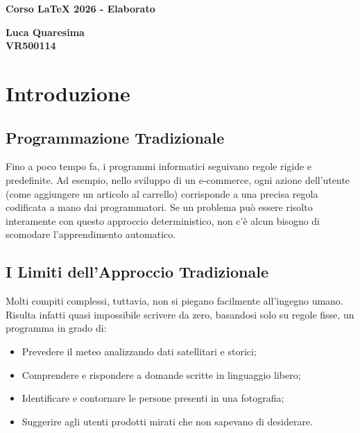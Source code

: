 \documentclass[a4paper,12pt]{report}
\begin{document}
\begin{titlepage}
    \begin{center}
        \vspace*{2cm}

        \Huge
        \textbf{Corso \LaTeX{} 2026 - Elaborato}

        \vspace{1.5cm}
        
        \Large
        \textbf{Luca Quaresima\\VR500114}

        \vspace*{1cm}
    \end{center}
\end{titlepage}

\tableofcontents

\chapter{Introduzione}

\section{Programmazione Tradizionale}
Fino a poco tempo fa, i programmi informatici seguivano regole rigide e predefinite. Ad esempio, nello sviluppo di un e-commerce, ogni azione dell'utente (come aggiungere un articolo al carrello) corrisponde a una precisa regola codificata a mano dai programmatori. Se un problema può essere risolto interamente con questo approccio deterministico, non c'è alcun bisogno di scomodare l'apprendimento automatico.

\section{I Limiti dell'Approccio Tradizionale}
Molti compiti complessi, tuttavia, non si piegano facilmente all'ingegno umano. Risulta infatti quasi impossibile scrivere da zero, basandosi solo su regole fisse, un programma in grado di:
\begin{itemize}
    \item Prevedere il meteo analizzando dati satellitari e storici;
    \item Comprendere e rispondere a domande scritte in linguaggio libero;
    \item Identificare e contornare le persone presenti in una fotografia;
    \item Suggerire agli utenti prodotti mirati che non sapevano di desiderare.
\end{itemize}
\end{document}
